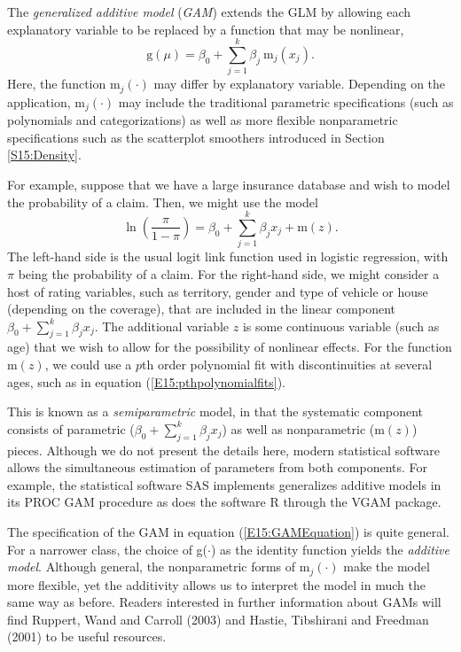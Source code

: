The \emph{generalized additive model} (\emph{GAM}) extends the GLM
by allowing each explanatory variable to be replaced by a function
that may be nonlinear,
\begin{equation}\label{E15:GAMEquation}
\mathrm{g} \left( \mu  \right) = \beta_0 + \sum _{j=1}^k \beta_j
~\mathrm{m}_j(x_j) .
\end{equation}
Here, the function $\mathrm{m}_j(\cdot)$ may differ by explanatory
variable. Depending on the application, $\mathrm{m}_j(\cdot)$ may
include the traditional parametric specifications (such as
polynomials and categorizations) as well as more flexible
nonparametric specifications such as the scatterplot smoothers
introduced in Section \ref{S15:Density}.

For example, suppose that we have a large insurance database and
wish to model the probability of a claim. Then, we might use the
model
\begin{equation*}
\ln \left(\frac{\pi}{1-\pi} \right) = \beta_0 + \sum _{j=1}^k
\beta_j x_j + \mathrm{m}(z) .
\end{equation*}
The left-hand side is the usual logit link function used in logistic
regression, with $\pi$ being the probability of a claim. For the
right-hand side, we might consider a host of rating variables, such
as territory, gender and type of vehicle or house (depending on the
coverage), that are included in the linear component $\beta_0 + \sum
_{j=1}^k \beta_j x_j$. The additional variable $z$ is some
continuous variable (such as age) that we wish to allow for the
possibility of nonlinear effects. For the function $\mathrm{m}(z)$,
we could use a $p$th order polynomial fit with discontinuities at
several ages, such as in equation (\ref{E15:pthpolynomialfits}).


This is known as a \emph{semiparametric} model, in that the
systematic component consists of parametric ($\beta_0 + \sum
_{j=1}^k \beta_j x_j$) as well as nonparametric ($\mathrm{m}(z)$)
pieces. Although we do not present the details here, modern
statistical software allows the simultaneous estimation of
parameters from both components. For example, the statistical
software SAS implements generalizes additive models in its PROC GAM
procedure as does the software R through the VGAM package.

The specification of the GAM in equation (\ref{E15:GAMEquation}) is
quite general. For a narrower class, the choice of g($\cdot$) as the
identity function yields the \emph{additive model}. Although
general, the nonparametric forms of $\mathrm{m}_j(\cdot)$ make the
model more flexible, yet the additivity allows us to interpret the
model in much the same way as before. Readers interested in further
information about GAMs will find Ruppert, Wand and Carroll (2003)
and Hastie, Tibshirani and Freedman (2001) to be useful resources.

